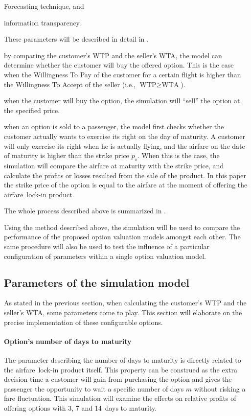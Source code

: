 \begin{description}
\begin{inparaenum}
    \item Forecasting technique, and
    \item information transparency.
    \end{inparaenum} These parameters will be described in detail in .
\item[Compare the WTP with the WTA] by comparing the customer's WTP and the seller's WTA, the model can determine whether the customer will buy the offered option. This is the case when the Willingness To Pay of the customer for a certain flight is higher than the Willingness To Accept of the seller (i.e., $\text{WTP} \ge \text{WTA}$).
\item[Sell the option] when the customer will buy the option, the simulation will ``sell'' the option at the specified price.
\item[Calculate generated profits] when an option is sold to a passenger, the model first checks whether the customer actually wants to exercise its right on the day of maturity. A customer will only exercise its right when he is actually flying, and the airfare on the date of maturity is higher than the strike price $p_s$. When this is the case, the simulation will compare the airfare at maturity with the strike price, and calculate the profits or losses resulted from the sale of the product. In this paper the strike price of the option is equal to the airfare at the moment of offering the airfare~lock-in product.
\end{description}

The whole process described above is summarized in .

Using the method described above, the simulation will be used to compare the performance of the proposed option valuation models amongst each other. The same procedure will also be used to test the influence of a particular configuration of parameters within a single option valuation model.

\subsection{Parameters of the simulation model}
As stated in the previous section, when calculating the customer's WTP and the seller's WTA, some parameters come to play. This section will elaborate on the precise implementation of these configurable options.


\paragraph{Option's number of days to maturity}
The parameter describing the number of days to maturity is directly related to the airfare~lock-in product itself. This property can be construed as the extra decision time a customer will gain from purchasing the option and gives the passenger the opportunity to wait a specific number of days $m$ without risking a fare fluctuation. This simulation will examine the effects on relative profits of offering options with 3, 7 and 14~days to maturity.

